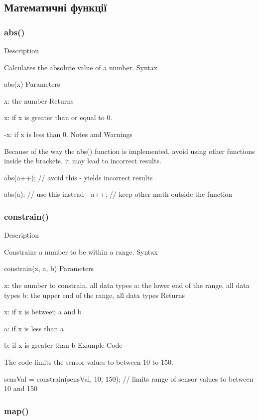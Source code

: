 \documentclass[12pt,a4paper]{report}  %
\begin{document}
\subsection{Математичні функції}

\subsubsection{abs()}\label{abs}

Description

Calculates the absolute value of a number.
Syntax

abs(x)
Parameters

x: the number
Returns

x: if x is greater than or equal to 0.

-x: if x is less than 0.
Notes and Warnings

Because of the way the abs() function is implemented, avoid using other functions inside the brackets, it may lead to incorrect results.

abs(a++);   // avoid this - yields incorrect results

abs(a);         // use this instead -
a++;        // keep other math outside the function

\subsubsection{constrain()}\label{constrain}

Description

Constrains a number to be within a range.
Syntax

constrain(x, a, b)
Parameters

x: the number to constrain, all data types a: the lower end of the range, all data types b: the upper end of the range, all data types
Returns

x: if x is between a and b

a: if x is less than a

b: if x is greater than b
Example Code

The code limits the sensor values to between 10 to 150.

sensVal = constrain(sensVal, 10, 150);    // limits range of sensor values to between 10 and 150

\subsubsection{map()}\label{map}
\end{document}

